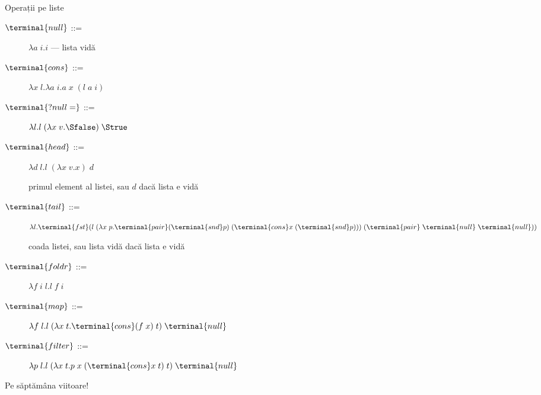 \documentclass[xcolor=pdftex,romanian,colorlinks]{beamer}
\newcommand{\intens}[1] {{\color{DeepSkyBlue3} #1}}
\newcommand{\Spair}{\terminal{pair}}
\newcommand{\Sfst}{\terminal{fst}}
\newcommand{\Ssnd}{\terminal{snd}}
\newcommand{\Snull}{\terminal{null}}
\newcommand{\Scons}{\terminal{cons}}
\newcommand{\Shead}{\terminal{head}}
\newcommand{\SisNull}{\terminal{?null=}}
\newcommand{\Stail}{\terminal{tail}}
\newcommand{\Sfoldr}{\terminal{foldr}}
\newcommand{\Smap}{\terminal{map}}
\newcommand{\Sfilter}{\terminal{filter}}
\begin{document}
\begin{frame}{Operații pe liste}

  \begin{description}
    \item[$\Snull$ ::=] $\lambda a\; i.i$ --- lista vidă
    \item[$\Scons$ ::=] $\lambda x\; l.\lambda a\; i.a\; x\; (l\; a\; i)$
    \item[]
    \pause
    \item[$\SisNull$ ::=] $\lambda l. l\; (\lambda x\; v.\Sfalse)\; \Strue$
    \pause
    \item[$\Shead$ ::=] $\lambda d\; l. l\; (\lambda x\; v.x)\; d$

    primul element al listei, sau $d$ dacă lista e vidă

    \pause
    \item[$\Stail$ ::=] $\lambda l. \Sfst (l\; (\lambda x\; p.\Spair (\Ssnd p)\; (\Scons x\; (\Ssnd p)))\; (\Spair\; \Snull\; \Snull))$

    coada listei, sau lista vidă dacă lista e vidă

    \item[$\Sfoldr$ ::=] $\lambda f\; i\; l. l\; f\; i$
    \item[$\Smap$ ::=] $\lambda f\; l. l\; (\lambda x\; t.\Scons (f\; x)\; t)\; \Snull$
    \item[$\Sfilter$ ::=] $\lambda p\; l. l\; (\lambda x\; t.p\; x\; (\Scons x\; t)\; t)\; \Snull$

  \end{description}
\end{frame}

\begin{frame}{}
\vfill\begin{center}
\intens{Pe s\u apt\u am\^ana viitoare!}
\end{center}
\vfill
\end{frame}
\end{document}
